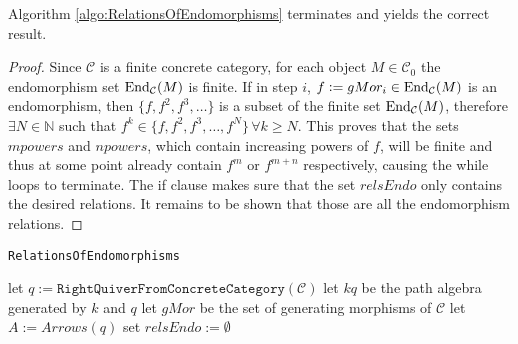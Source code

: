 \begin{lemma}
Algorithm \ref{algo:RelationsOfEndomorphisms} terminates and yields the correct result.
\begin{proof}
Since $\mathcal{C}$ is a finite concrete category, for each object $M \in \mathcal{C}_{0}$ the endomorphism set
$\textup{End}_{\mathcal{C}}(M)$ is finite. If in step $i$, $f := gMor_{i} \in \textup{End}_{\mathcal{C}}(M)$ is an endomorphism,
then $\{f, f^{2}, f^{3}, \dots\}$ is a subset of the finite set $\textup{End}_{\mathcal{C}}(M)$, therefore $\exists N \in \mathbb{N}$ such that
$f^{k} \in \{f, f^{2}, f^{3}, \dots, f^{N}\} \, \forall k \geq N$.
This proves that the sets $mpowers$ and $npowers$, which contain increasing powers of $f$, will be finite and thus at some point
already contain $f^{m}$ or $f^{m+n}$ respectively, causing the while loops to terminate.
The if clause makes sure that the set $relsEndo$ only contains the desired relations. It remains to be shown that those are all
the endomorphism relations.
\end{proof}
\end{lemma}

\begin{algorithm}\capstart
    \caption{\texttt{RelationsOfEndomorphisms}}\label{algo:RelationsOfEndomorphisms}
	\BlankLine
	let $q := \texttt{RightQuiverFromConcreteCategory}(\mathcal{C})$\;
	let $kq$ be the path algebra generated by $k$ and $q$\;
	let $gMor$ be the set of generating morphisms of $\mathcal{C}$\;
	let $A := Arrows(q)$\;
	set $relsEndo := \emptyset$\;
	\;
\end{algorithm}